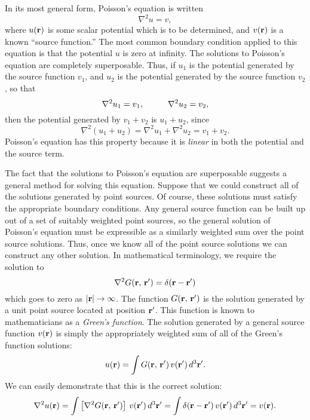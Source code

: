 In its most general form, Poisson's equation is written
\begin{equation}
\nabla^2 u = v,
\end{equation}
 where $u({\bf r})$ is some scalar potential which is
to be determined, and
$ v({\bf r})$ is a known ``source function.'' The most common boundary condition
applied to this equation is that the potential $u$  is zero at infinity.
The solutions to Poisson's equation are completely superposable. Thus, if
$u_1$ is the potential generated by the source function $v_1$, and
$u_2$ is the potential generated by the source function $v_2$, so that
\begin{equation}
\nabla^2 u_1 = v_1, \mbox{\hspace{1cm}} \nabla^2 u_2=v_2,
\end{equation}
then the potential generated by $v_1 + v_2$ is $u_1+u_2$, since
\begin{equation}
\nabla^2(u_1+u_2) = \nabla^2 u_1 + \nabla^2 u_2 = v_1 + v_2.
\end{equation}
Poisson's equation has this property because it is {\em linear}\/ in both the
potential and the source term.

The fact that the solutions to Poisson's equation are superposable suggests a
general method for solving this equation. Suppose that we could construct all
of the  solutions
generated by point sources. Of course, these solutions
must satisfy the appropriate boundary conditions.
Any general source function can be built up out of a set of suitably weighted
point sources, so the general solution of Poisson's equation must be
expressible as a similarly weighted sum over the point source solutions. Thus, once we
know all of the point source solutions we can construct any other solution.
In mathematical terminology, we require the solution to
\begin{equation}\label{e363}
\nabla^2 G({\bf r}, \,{\bf r}') = \delta({\bf r} - {\bf r}')
\end{equation}
which goes to zero as $|{\bf r}|
 \rightarrow\infty$. The function $G({\bf r}, \,{\bf r}')$
is the solution generated by a unit point source located at position ${\bf r}'$.
This function is known to mathematicians as a {\em Green's function}. The solution
generated by a general source function $v({\bf r})$ is simply the 
appropriately weighted sum of
all of the Green's function solutions:
\begin{equation}\label{e364}
u({\bf r}) = \int G({\bf r},\, {\bf r}')\, v({\bf r}')\,d^3 {\bf r}'.
\end{equation}
We can easily demonstrate that this is the correct solution:
\begin{equation}
\nabla^2 u({\bf r}) = \int \left[\nabla^2 
G({\bf r},\, {\bf r}')\right]\, v({\bf r}')\,d^3 {\bf r}'
= \int \delta({\bf r} - {\bf r}')\,v({\bf r}')\,d^3 {\bf r}' = v({\bf r}).
\end{equation}

